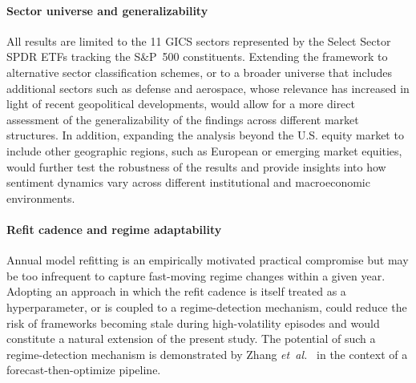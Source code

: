 \paragraph{Sector universe and generalizability} All results are limited to the 11 GICS sectors represented by the Select Sector SPDR ETFs tracking the S\&P~500 constituents. Extending the framework to alternative sector classification schemes, or to a broader universe that includes additional sectors such as defense and aerospace, whose relevance has increased in light of recent geopolitical developments, would allow for a more direct assessment of the generalizability of the findings across different market structures. In addition, expanding the analysis beyond the U.S. equity market to include other geographic regions, such as European or emerging market equities, would further test the robustness of the results and provide insights into how sentiment dynamics vary across different institutional and macroeconomic environments.

\paragraph{Refit cadence and regime adaptability} Annual model refitting is an empirically motivated practical compromise but may be too infrequent to capture fast-moving regime changes within a given year. Adopting an approach in which the refit cadence is itself treated as a hyperparameter, or is coupled to a regime-detection mechanism, could reduce the risk of frameworks becoming stale during high-volatility episodes and would constitute a natural extension of the present study. The potential of such a regime-detection mechanism is demonstrated by Zhang \emph{et~al.}~\cite{4e332} in the context of a forecast-then-optimize pipeline.